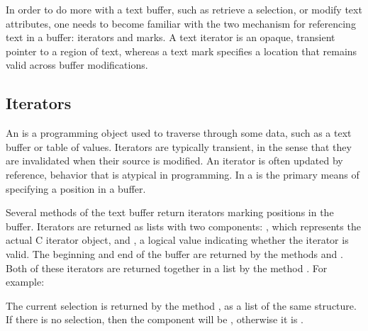 In order to do more with a text buffer, such as retrieve a selection,
or modify text attributes, one needs to become familiar with the two
mechanism for referencing text in a buffer: iterators and marks.  A
text iterator is an opaque, transient pointer to a region of text,
whereas a text mark specifies a location that remains valid across
buffer modifications.

\subsection{Iterators}


An  is a programming object used to traverse through
some data, such as a text buffer or table of values. Iterators are
typically transient, in the sense that they are invalidated when their
source is modified. An iterator is often updated by reference,
behavior that is atypical in \R\/ programming.  In \GTK{} a  is the primary means of specifying a position in a buffer.

Several methods of the text buffer return iterators marking positions
in the buffer.  Iterators are returned as lists with two components:
, which represents the actual C iterator object, and
, a logical value indicating whether the iterator is
valid.  The beginning and end of the buffer are returned by the
methods  and
. Both of these iterators are
returned together in a list by the method
.  For example:
\begin{Schunk}
\end{Schunk}
%
The current selection is returned by the method
, as a list of the same
structure. If there is no selection, then the component 
will be , otherwise it is .

